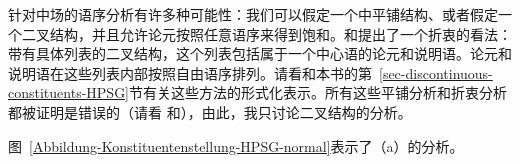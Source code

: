 针对中场的语序分析有许多种可能性：我们可以假定一个\gpsg 中平铺结构\citep{Kasper94a}、或者假定一个二叉结构，并且允许论元按照任意语序来得到饱和。\citet{Kathol2001a}和\citet{Mueller99a,Mueller2002b,Mueller2004b}提出了一个折衷的看法：带有具体列表的二叉结构，这个列表包括属于一个中心语的论元和说明语。论元和说明语在这些列表内部按照自由语序排列。请看和本书的第~\ref{sec-discontinuous-constituents-HPSG}节有关这些方法的形式化表示。所有这些平铺分析和折衷分析都被证明是错误的（请看\citealp{Mueller2005c,Mueller2004e} 和\citealp[Section~9.5.1]{MuellerLehrbuch1}），由此，我只讨论二叉结构的分析。

图~\vref{Abbildung-Konstituentenstellung-HPSG-normal}表示了（a）的分析。

